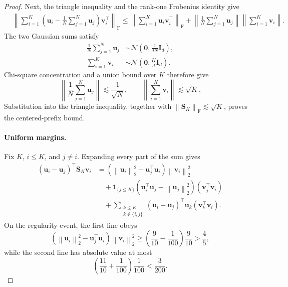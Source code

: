 \documentclass[11pt]{article}
\theoremstyle{definition}
\newcommand{\ub}{\mathbf{u}}
\newcommand{\vb}{\mathbf{v}}
\newcommand{\Ib}{\mathbf{I}}
\newcommand{\Sb}{\mathbf{S}}
\newcommand{\norm}[1]{\left\lVert #1\right\rVert_2}
\newcommand{\normF}[1]{\left\lVert #1\right\rVert_{\mathrm F}}
\begin{document}
\begin{proof}
Next, the triangle inequality and the rank-one Frobenius identity give
\begin{align*}
 &\left\|
  \sum_{i=1}^K
  \left(\ub_i-\frac1N\sum_{j=1}^N\ub_j\right)\vb_i^\top
 \right\|_{\mathrm F}\leq
 \left\|\sum_{i=1}^K\ub_i\vb_i^\top\right\|_{\mathrm F}
 +\left\|\frac1N\sum_{j=1}^N\ub_j\right\|
  \left\|\sum_{i=1}^K\vb_i\right\|.
\end{align*}
The two Gaussian sums satisfy
\begin{align*}
 \frac1N\sum_{j=1}^N\ub_j
 &\sim\mathcal N\!\left(\mathbf0,\frac1{dN}\Ib_d\right),\\
 \sum_{i=1}^K\vb_i
 &\sim\mathcal N\!\left(\mathbf0,\frac Kd\Ib_d\right).
\end{align*}
Chi-square concentration and a union bound over $K$ therefore give
\[
 \left\|\frac1N\sum_{j=1}^N\ub_j\right\|\lesssim\frac1{\sqrt N},
 \qquad
 \left\|\sum_{i=1}^K\vb_i\right\|\lesssim\sqrt K.
\]
Substitution into the triangle inequality, together with
$\normF{\Sb_K}\lesssim\sqrt K$, proves the centered-prefix bound.

\paragraph{Uniform margins.}
Fix $K$, $i\leq K$, and $j\ne i$.  Expanding every part of the sum gives
\begin{align*}
 (\ub_i-\ub_j)^\top\Sb_K\vb_i
 &=
 (\norm{\ub_i}^2-\ub_j^\top\ub_i)\norm{\vb_i}^2\\
 &\quad+
 \mathbf{1}_{\{j\leq K\}}
 (\ub_i^\top\ub_j-\norm{\ub_j}^2)(\vb_j^\top\vb_i)\\
 &\quad+
 \sum_{\substack{k\leq K\\k\notin\{i,j\}}}
 (\ub_i-\ub_j)^\top\ub_k(\vb_k^\top\vb_i).
\end{align*}
On the regularity event, the first line obeys
\[
 (\norm{\ub_i}^2-\ub_j^\top\ub_i)\norm{\vb_i}^2
 \geq\left(\frac9{10}-\frac1{100}\right)\frac9{10}
 >\frac45,
\]
while the second line has absolute value at most
\[
 \left(\frac{11}{10}+\frac1{100}\right)\frac1{100}<\frac3{200}.
\]


\end{proof}
\end{document}
